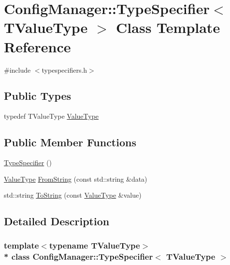 \hypertarget{class_config_manager_1_1_type_specifier}{}\section{Config\+Manager\+:\+:Type\+Specifier$<$ T\+Value\+Type $>$ Class Template Reference}
\label{class_config_manager_1_1_type_specifier}


{\ttfamily \#include $<$typespecifiers.\+h$>$}

\subsection*{Public Types}
\begin{DoxyCompactItemize}
\item 
typedef T\+Value\+Type \hyperlink{class_config_manager_1_1_type_specifier_a30331e624a3c4a1c18eb5b838e93acea}{Value\+Type}
\end{DoxyCompactItemize}
\subsection*{Public Member Functions}
\begin{DoxyCompactItemize}
\item 
\hyperlink{class_config_manager_1_1_type_specifier_a11763b8857f9d1d00e72f4376749ac62}{Type\+Specifier} ()
\item 
\hyperlink{class_config_manager_1_1_type_specifier_a30331e624a3c4a1c18eb5b838e93acea}{Value\+Type} \hyperlink{class_config_manager_1_1_type_specifier_a4298803c2b4c3ca21f0861572ae917a3}{From\+String} (const std\+::string \&data)
\item 
std\+::string \hyperlink{class_config_manager_1_1_type_specifier_ae674750fb5e002cbd524adf80bfb7bc7}{To\+String} (const \hyperlink{class_config_manager_1_1_type_specifier_a30331e624a3c4a1c18eb5b838e93acea}{Value\+Type} \&value)
\end{DoxyCompactItemize}


\subsection{Detailed Description}
\subsubsection*{template$<$typename T\+Value\+Type$>$\\*
class Config\+Manager\+::\+Type\+Specifier$<$ T\+Value\+Type $>$}

